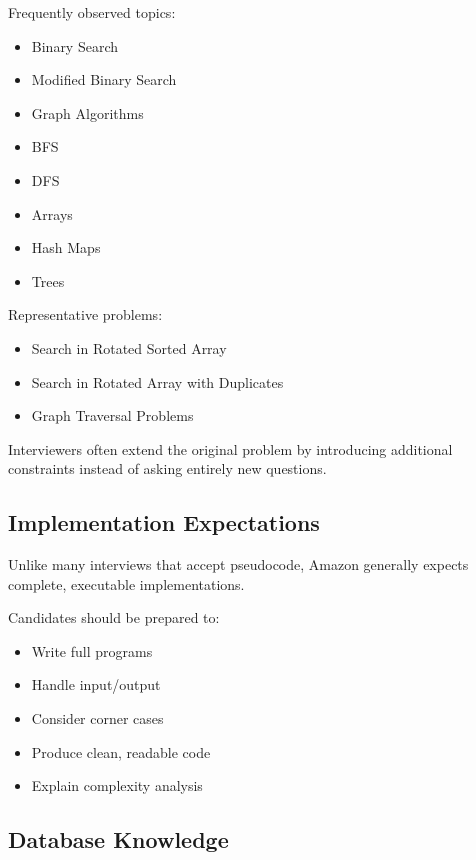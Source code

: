 \documentclass[11pt,a4paper]{article}
\begin{document}
Frequently observed topics:

\begin{itemize}
	\item Binary Search
	\item Modified Binary Search
	\item Graph Algorithms
	\item BFS
	\item DFS
	\item Arrays
	\item Hash Maps
	\item Trees
\end{itemize}

Representative problems:

\begin{itemize}
	\item Search in Rotated Sorted Array
	\item Search in Rotated Array with Duplicates
	\item Graph Traversal Problems
\end{itemize}

Interviewers often extend the original problem by introducing additional constraints instead of asking entirely new questions.


\subsection{Implementation Expectations}

Unlike many interviews that accept pseudocode, Amazon generally expects complete, executable implementations.

Candidates should be prepared to:

\begin{itemize}
	\item Write full programs
	\item Handle input/output
	\item Consider corner cases
	\item Produce clean, readable code
	\item Explain complexity analysis
\end{itemize}


\subsection{Database Knowledge}
\end{document}
